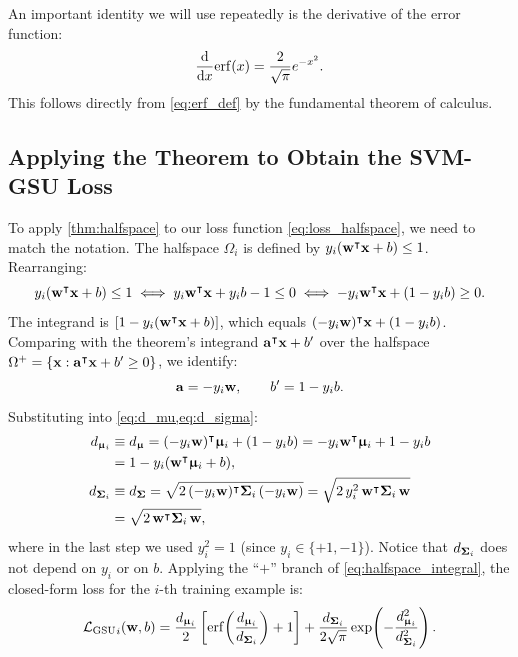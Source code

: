 \documentclass[11pt, letterpaper]{article}
\newcommand{\bSigma}{\vb{\Sigma}}
\newcommand{\bmu}{\boldsymbol{\upmu}}
\newcommand{\loss}{\mathcal{L}}
\begin{document}
An important identity we will use repeatedly is the derivative of the error function:
\begin{equation}\label{eq:erf_derivative}
    \dv{x}\mathrm{erf}(x) = \frac{2}{\sqrt{\pi}}e^{-x^2}.
\end{equation}
This follows directly from \cref{eq:erf_def} by the fundamental theorem of calculus.

\subsection{Applying the Theorem to Obtain the SVM-GSU Loss}\label{sec:applying_thm}

To apply \cref{thm:halfspace} to our loss function \cref{eq:loss_halfspace}, we need to match the notation. The halfspace $\Omega_i$ is defined by $y_i(\vb{w}^{\intercal} \vb{x} + b) \leq 1$. Rearranging:
\begin{equation}
    y_i(\vb{w}^{\intercal}\vb{x} + b) \leq 1 \iff y_i \vb{w}^{\intercal}\vb{x} + y_i b - 1 \leq 0 \iff -y_i\vb{w}^{\intercal}\vb{x} + (1 - y_i b) \geq 0.
\end{equation}
The integrand is $[1 - y_i(\vb{w}^{\intercal} \vb{x} + b)]$, which equals $(-y_i \vb{w})^{\intercal} \vb{x} + (1 - y_i b)$. Comparing with the theorem's integrand $\vb{a}^{\intercal} \vb{x} + b'$ over the halfspace $\Omega^+ = \left\{\vb{x}: \vb{a}^{\intercal}\vb{x} + b' \geq 0\right\}$, we identify:
\begin{equation}
    \vb{a} = -y_i \vb{w}, \qquad b' = 1 - y_i b.
\end{equation}
Substituting into \cref{eq:d_mu,eq:d_sigma}:
\begin{align}
    d_{\bmu_i} &\equiv d_{\bmu} = (-y_i \vb{w})^{\intercal} \bmu_i + (1 - y_i b) = -y_i\vb{w}^{\intercal}\bmu_i + 1 - y_i b \notag \\
    &= 1 - y_i(\vb{w}^{\intercal} \bmu_i + b), \label{eq:dmu_def}\\
    d_{\bSigma_i} &\equiv d_{\bSigma} = \sqrt{2\,(-y_i \vb{w})^{\intercal} \bSigma_i\, (-y_i \vb{w})} = \sqrt{2\, y_i^2\, \vb{w}^{\intercal} \bSigma_i\, \vb{w}} \notag \\
    &= \sqrt{2\, \vb{w}^{\intercal} \bSigma_i\, \vb{w}}, \label{eq:dsigma_def}
\end{align}
where in the last step we used $y_i^2 = 1$ (since $y_i \in \{+1, -1\}$). Notice that $d_{\bSigma_i}$ does not depend on $y_i$ or on $b$. Applying the ``$+$'' branch of \cref{eq:halfspace_integral}, the closed-form loss for the $i$-th training example is:
\begin{equation}\label{eq:gsu_loss_closed}
    {\loss_{\text{GSU}}}_{i}(\vb{w}, b) = \frac{d_{\bmu_i}}{2}\left[\mathrm{erf}\!\left(\frac{d_{\bmu_i}}{d_{\bSigma_i}}\right) + 1\right] + \frac{d_{\bSigma_i}}{2\sqrt{\pi}}\exp\!\left(-\frac{d_{\bmu_i}^2}{d_{\bSigma_i}^2}\right).
\end{equation}
\end{document}
